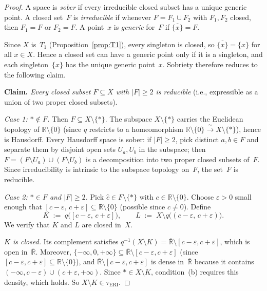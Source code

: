 \documentclass[11pt]{article}
\theoremstyle{definition}
\theoremstyle{remark}
\begin{document}
\begin{proof}
A space is \emph{sober} if every irreducible closed subset has a unique
generic point.  A closed set~$F$ is \emph{irreducible} if whenever
$F = F_1 \cup F_2$ with $F_1, F_2$ closed, then $F_1 = F$ or $F_2 = F$.
A point~$x$ is \emph{generic} for~$F$ if $\overline{\{x\}} = F$.

Since $X$ is~$T_1$ (Proposition~\ref{prop:T1}), every singleton is
closed, so $\overline{\{x\}} = \{x\}$ for all $x \in X$.  Hence a closed
set can have a generic point only if it is a singleton, and each
singleton~$\{x\}$ has the unique generic point~$x$.  Sobriety therefore
reduces to the following claim.

\medskip
\noindent\textbf{Claim.}\; \emph{Every closed subset $F \subseteq X$
with $|F| \geq 2$ is reducible} (i.e., expressible as a union of two
proper closed subsets).
\medskip

\noindent\emph{Case 1: $\ast \notin F$.}\;
Then $F \subseteq X \setminus \{\ast\}$.  The subspace
$X \setminus \{\ast\}$ carries the Euclidean topology of
$\mathbb{R}\setminus\{0\}$ (since $q$ restricts to a homeomorphism
$\mathbb{R}\setminus\{0\} \xrightarrow{\;\sim\;} X\setminus\{\ast\}$),
hence is Hausdorff.  Every Hausdorff space is sober: if $|F| \geq 2$,
pick distinct $a, b \in F$ and separate them by disjoint open sets
$U_a, U_b$ in the subspace; then $F = (F \setminus U_a) \cup (F \setminus U_b)$
is a decomposition into two proper closed subsets of~$F$.
Since irreducibility is intrinsic to the subspace topology on~$F$,
the set~$F$ is reducible.

\smallskip
\noindent\emph{Case 2: $\ast \in F$ and $|F| \geq 2$.}\;
Pick $\hat{c} \in F \setminus \{\ast\}$ with
$c \in \mathbb{R}\setminus\{0\}$.  Choose $\varepsilon > 0$ small
enough that $[c - \varepsilon,\, c + \varepsilon] \subseteq
\mathbb{R}\setminus\{0\}$ (possible since $c \neq 0$).  Define
\[
  K \;:=\; q\bigl([c-\varepsilon,\, c+\varepsilon]\bigr),
  \qquad
  L \;:=\; X \setminus q\bigl((c-\varepsilon,\, c+\varepsilon)\bigr).
\]
We verify that $K$ and $L$ are closed in~$X$.

\emph{$K$ is closed.}\;
Its complement satisfies
$q^{-1}(X \setminus K) = \overline{\mathbb{R}} \setminus
[c-\varepsilon, c+\varepsilon]$, which is open in~$\overline{\mathbb{R}}$.
Moreover, $\{-\infty, 0, +\infty\} \subseteq
\overline{\mathbb{R}} \setminus [c-\varepsilon,c+\varepsilon]$
(since $[c-\varepsilon,c+\varepsilon] \subseteq
\mathbb{R}\setminus\{0\}$), and
$\overline{\mathbb{R}} \setminus [c-\varepsilon,c+\varepsilon]$
is dense in~$\overline{\mathbb{R}}$ because it contains
$(-\infty, c-\varepsilon) \cup (c+\varepsilon, +\infty)$.
Since $\ast \in X \setminus K$, condition~(b) requires this density,
which holds.  So $X \setminus K \in \tau_{\mathrm{ERI}}$.


\end{proof}
\end{document}
